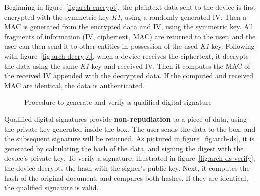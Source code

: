 Beginning in figure~\ref{fig:arch-encrypt}, the plaintext data sent to the device is first encrypted with the symmetric key \textit{K1}, using a randomly generated \ac{IV}. Then a \ac{MAC} is generated from the encrypted data and \ac{IV}, using the symmetric key. All fragments of information (IV, ciphertext, MAC) are returned to the user, and the user can then send it to other entities in possession of the used \textit{K1} key.
Following with figure~\ref{fig:arch-decrypt}, when a device receives the ciphertext, it decrypts the data using the same \textit{K1} key and received \ac{IV}. Then it computes the MAC of the received \ac{IV} appended with the decrypted data. If the computed and received \ac{MAC} are identical, the data is authenticated.

\begin{figure}[h]
	\centering     %
	\caption{Procedure to generate and verify a qualified digital signature}
\end{figure}

Qualified digital signatures provide \textbf{non-repudiation} to a piece of data, using the private key generated inside the box. The user sends the data to the box, and the subsequent signature will be returned. As pictured in figure~\ref{fig:arch-ds}, it is generated by calculating the hash of the data, and signing the digest with the device's private key. To verify a signature, illustrated in figure~\ref{fig:arch-ds-verify}, the device decrypts the hash with the signer's public key. Next, it computes the hash of the original document, and compares both hashes. If they are identical, the qualified signature is valid.

